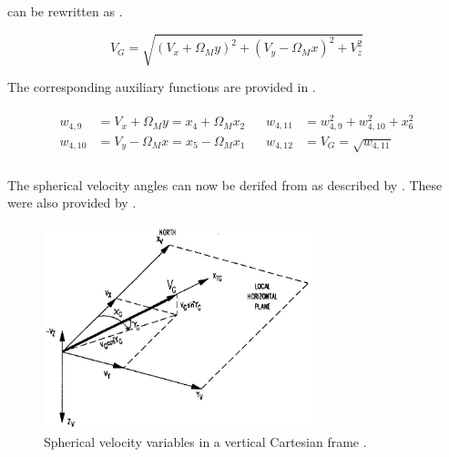  can be rewritten as .

\begin{equation}\label{eq:xfifteen}
V_{G} = \sqrt{\left(V_{x}+\Omega_{M}y\right)^{2}+\left(V_{y}-\Omega_{M}x\right)^{2}+V_{z}^{2}} 
\end{equation}

The corresponding auxiliary functions are provided in .

\begin{align} \label{eq:velocityAuxF}
\begin{split}
w_{4,9} &= V_{x}+\Omega_{M}y = x_{4}+\Omega_{M}x_{2} \\
w_{4,10} &= V_{y}-\Omega_{M}x = x_{5}-\Omega_{M}x_{1} \\
\end{split}
&
\begin{split}
w_{4,11} &= w_{4,9}^{2}+w_{4,10}^{2}+x_{6}^{2} \\
w_{4,12} &= V_{G}=\sqrt{w_{4,11}} \\
\end{split} 
\end{align} 

 
The spherical velocity angles can now be derifed from  as described by . These were also provided by \cite{mooij1994motion}. 

 \begin{figure}[!ht]
\centering
\includegraphics[width=0.7\textwidth]{figures/reference_frames/vertical_spherical_mooij1994motion.jpg}
\caption{Spherical velocity variables in a vertical Cartesian frame \citep{mooij1994motion}.}
\label{fig:vertical_spherical_mooij1994motion}
\end{figure}



